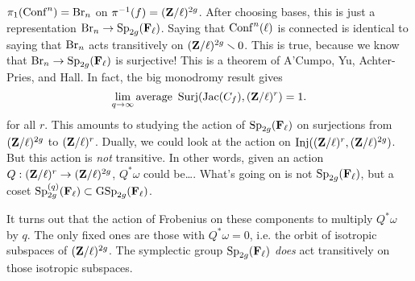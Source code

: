 $\pi_1(\operatorname{Conf}^n)=\textnormal{Br}_n$ on $\pi^{-1}(f) =(\mathbf{Z}/\ell)^{2 g}$. After 
choosing bases, this is just a representation 
$\textnormal{Br}_n \to \operatorname{Sp}_{2 g}(\mathbf{F}_\ell)$.  Saying that $\operatorname{Conf}^n(\ell)$ is 
connected is identical to saying that $\textnormal{Br}_n$ acts transitively on 
$(\mathbf{Z}/\ell)^{2 g}\smallsetminus 0$. This is true, because we know that 
$\textnormal{Br}_n\to \operatorname{Sp}_{2 g}(\mathbf{F}_\ell)$ is surjective! This is a theorem of 
A'Cumpo, Yu, Achter-Pries, and Hall. In fact, the big monodromy result gives 
\[
  \lim_{q\to \infty} \text{average } \operatorname{Surj}(\operatorname{Jac}(C_f),(\mathbf{Z}/\ell)^r) = 1 .
\]
for all $r$. This amounts to studying the action of $\operatorname{Sp}_{2g}(\mathbf{F}_\ell)$ 
on surjections from $(\mathbf{Z}/\ell)^{2 g}$ to $(\mathbf{Z}/\ell)^r$. Dually, we could look 
at the action on $\operatorname{Inj}((\mathbf{Z}/\ell)^r,(\mathbf{Z}/\ell)^{2 g})$. But this 
action is \emph{not} transitive. In other words, given an action 
$Q:(\mathbf{Z}/\ell)^r \to (\mathbf{Z}/\ell)^{2 g}$, $Q^\ast\omega$ could be\ldots. What's 
going on is not $\operatorname{Sp}_{2g}(\mathbf{F}_\ell)$, but a coset 
$\operatorname{Sp}_{2 g}^{(q)}(\mathbf{F}_\ell)\subset \operatorname{GSp}_{2 g}(\mathbf{F}_\ell)$. 

It turns out that the action of Frobenius on these components to multiply 
$Q^\ast \omega$ by $q$. The only fixed ones are those with $Q^\ast\omega=0$, i.e. 
the orbit of isotropic subspaces of $(\mathbf{Z}/\ell)^{2 g}$. The symplectic group 
$\operatorname{Sp}_{2 g}(\mathbf{F}_\ell)$ \emph{does} act transitively on those isotropic 
subspaces. 




